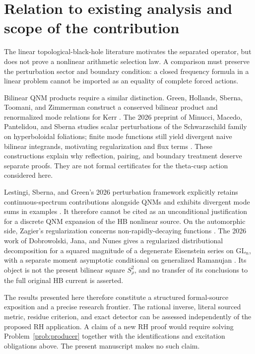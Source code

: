 \section{Relation to existing analysis and scope of the contribution}

The linear topological-black-hole literature \cite{aros,ki,bm} motivates the separated operator, but does not prove a nonlinear arithmetic selection law. A comparison must preserve the perturbation sector and boundary condition: a closed frequency formula in a linear problem cannot be imported as an equality of complete forced actions.

Bilinear QNM products require a similar distinction. Green, Hollands, Sberna, Toomani, and Zimmerman construct a conserved bilinear product and renormalized mode relations for Kerr \cite{green}. The 2026 preprint of Minucci, Macedo, Pantelidou, and Sberna studies scalar perturbations of the Schwarzschild family on hyperboloidal foliations; finite mode functions still yield divergent naive bilinear integrands, motivating regularization and flux terms \cite{minucci}. These constructions explain why reflection, pairing, and boundary treatment deserve separate proofs. They are not formal certificates for the theta-cusp action considered here.

Lestingi, Sberna, and Green's 2026 perturbation framework explicitly retains continuous-spectrum contributions alongside QNMs and exhibits divergent mode sums in examples \cite{lestingi}. It therefore cannot be cited as an unconditional justification for a discrete QNM expansion of the HB nonlinear source. On the automorphic side, Zagier's regularization concerns non-rapidly-decaying functions \cite{zagier}. The 2026 work of Dobrowolski, Jana, and Nunes gives a regularized distributional decomposition for a squared magnitude of a degenerate Eisenstein series on \(\mathrm{GL}_n\), with a separate moment asymptotic conditional on generalized Ramanujan \cite{djn}. Its object is not the present bilinear square \(S_\rho^2\), and no transfer of its conclusions to the full original HB current is asserted.

The results presented here therefore constitute a structured formal-source exposition and a precise research frontier. The rational inverse, literal sourced metric, residue criterion, and exact detector can be assessed independently of the proposed RH application. A claim of a new RH proof would require solving Problem~\ref{prob:producer} together with the identifications and excitation obligations above. The present manuscript makes no such claim.

